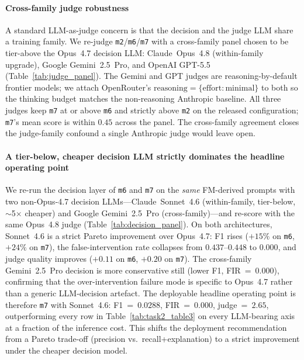 \paragraph{Cross-family judge robustness} A standard LLM-as-judge concern is that the decision and the judge LLM share a training family. We re-judge \texttt{m2}/\texttt{m6}/\texttt{m7} with a cross-family panel chosen to be tier-above the Opus~4.7 decision LLM: Claude~Opus~4.8 (within-family upgrade), Google Gemini~2.5~Pro, and OpenAI GPT-5.5 (Table~\ref{tab:judge_panel}). The Gemini and GPT judges are reasoning-by-default frontier models; we attach OpenRouter's $\mathrm{reasoning}\!=\!\{\mathrm{effort:minimal}\}$ to both so the thinking budget matches the non-reasoning Anthropic baseline. All three judges keep \texttt{m7} at or above \texttt{m6} and strictly above \texttt{m2} on the released configuration; \texttt{m7}'s mean score is within $0.45$ across the panel. The cross-family agreement closes the judge-family confound a single Anthropic judge would leave open.



\paragraph{A tier-below, cheaper decision LLM strictly dominates the headline operating point} We re-run the decision layer of \texttt{m6} and \texttt{m7} on the \emph{same} FM-derived prompts with two non-Opus-4.7 decision LLMs---Claude~Sonnet~4.6 (within-family, tier-below, $\sim$5$\times$ cheaper) and Google Gemini~2.5~Pro (cross-family)---and re-score with the same Opus~4.8 judge (Table~\ref{tab:decision_panel}). On both architectures, Sonnet~4.6 is a strict Pareto improvement over Opus~4.7: F1 rises ($+15\%$ on \texttt{m6}, $+24\%$ on \texttt{m7}), the false-intervention rate collapses from $0.437$--$0.448$ to $0.000$, and judge quality improves ($+0.11$ on \texttt{m6}, $+0.20$ on \texttt{m7}). The cross-family Gemini~2.5~Pro decision is more conservative still (lower F1, FIR~=~$0.000$), confirming that the over-intervention failure mode is specific to Opus~4.7 rather than a generic LLM-decision artefact. The deployable headline operating point is therefore \texttt{m7} with Sonnet~4.6: F1~=~$0.0288$, FIR~=~$0.000$, judge~=~$2.65$, outperforming every row in Table~\ref{tab:task2_table3} on every LLM-bearing axis at a fraction of the inference cost. This shifts the deployment recommendation from a Pareto trade-off (precision vs.\ recall+explanation) to a strict improvement under the cheaper decision model.

